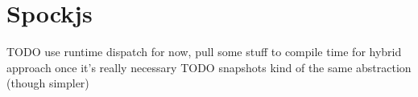 \section{Spockjs}
TODO use runtime dispatch for now, pull some stuff to compile time for hybrid approach once it's really necessary
TODO snapshots kind of the same abstraction (though simpler)
